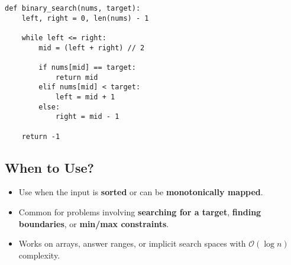 \begin{algo}
\begin{lstlisting}
def binary_search(nums, target):
    left, right = 0, len(nums) - 1

    while left <= right:
        mid = (left + right) // 2

        if nums[mid] == target:
            return mid
        elif nums[mid] < target:
            left = mid + 1
        else:
            right = mid - 1

    return -1
\end{lstlisting}
\end{algo}

\subsection{When to Use?}
\begin{summary}
    \begin{itemize}
        \item Use when the input is \textbf{sorted} or can be \textbf{monotonically mapped}.
        \item Common for problems involving \textbf{searching for a target}, \textbf{finding boundaries}, or \textbf{min/max constraints}.
        \item Works on arrays, answer ranges, or implicit search spaces with $\mathcal{O}(\log n)$ complexity.
    \end{itemize}
\end{summary}
\newpage


